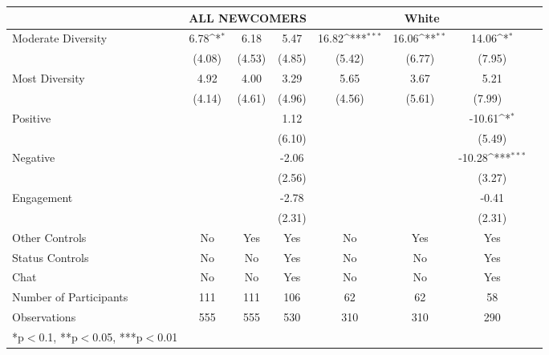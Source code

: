 {\tiny
\def\sym#1{\ifmmode^{#1}\else\(^{#1}\)\fi}
\begin{tabular}{l*{7}{c}}
\toprule
          & \multicolumn{3}{c}{ALL NEWCOMERS}   &\multicolumn{3}{c}{White}     \\
\midrule
Moderate Diversity  &  6.78\sym{*} &  6.18 &  5.47 &     16.82\sym{***}    &  16.06\sym{**}    &  14.06\sym{*}   \\
  &     (4.08) &  (4.53)  &  (4.85)   &     (5.42)   &  (6.77)      &  (7.95)\\
\addlinespace
Most Diversity  &  4.92  &   4.00   &  3.29    &   5.65   &   3.67  &  5.21   \\
  &      (4.14) & (4.61) &  (4.96)   &   (4.56)   &   (5.61)          &  (7.99) \ \\
                        
\addlinespace
Positive  &         &           &  1.12    &     &   &  -10.61\sym{*} \\
              &           &      &  (6.10) &     &   &  (5.49)   \\
\addlinespace
Negative    &     &        &  -2.06 &       &     &  -10.28\sym{***} \\
             &    &     &  (2.56)   &    &      &  (3.27)  \\
\addlinespace
Engagement    &     &         & -2.78     &      &    &  -0.41 \\
              &     &         &  (2.31)   &      &       &  (2.31) \\

\midrule
Other Controls   &   No &  Yes &    Yes    &    No  &    Yes &    Yes \\
Status Controls &   No  &    No    &    Yes    &    No  &   No &    Yes \\
Chat          &    No    &    No   &    Yes  &    No    &    No      &    Yes             \\
\midrule
Number of Participants & 111   &    111 &    106  &   62   &    62 &    58     \\
\midrule
Observations          &   555   &  555  &  530   &  310     &  310   &  290             \\
\bottomrule
*p$<$0.1, **p$<$0.05, ***p$<$0.01
\end{tabular}
}